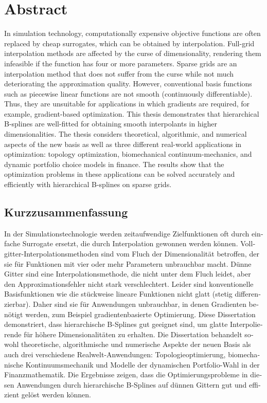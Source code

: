 
\printornamentsfalse
\section*{Abstract}
\printornamentstrue

In simulation technology, computationally expensive objective
functions are often replaced
by cheap surrogates, which can be obtained by interpolation.
Full-grid interpolation methods are affected by the curse of dimensionality,
rendering them infeasible if the function has four or more parameters.
Sparse grids are an interpolation method that does not suffer from the
curse while not much deteriorating the approximation quality.
However, conventional basis functions such as piecewise linear functions
are not smooth (continuously differentiable).
Thus, they are unsuitable for applications in which gradients are required,
for example, gradient-based optimization.
This thesis demonstrates that hierarchical B-splines are well-fitted for
obtaining smooth interpolants in higher dimensionalities.
The thesis considers theoretical, algorithmic, and numerical aspects of the
new basis as well as three different real-world applications in optimization:
topology optimization, biomechanical continuum-mechanics, and
dynamic portfolio choice models in finance.
The results show that the optimization problems in these applications
can be solved accurately and efficiently with hierarchical B-splines on
sparse grids.

\begin{otherlanguage}{ngerman}
  \section*{Kurzzusammenfassung}
  
  In der Simulationstechnologie werden zeitaufwendige Zielfunktionen
  oft durch einfache Surrogate ersetzt, die durch Interpolation
  gewonnen werden können.
  Vollgitter-Interpolationsmethoden sind vom Fluch der
  Dimensionalität betroffen, der sie für Funktionen mit vier oder mehr
  Parametern unbrauchbar macht.
  Dünne Gitter sind eine Interpolationsmethode, die nicht unter
  dem Fluch leidet, aber den Approximationsfehler nicht stark verschlechtert.
  Leider sind konventionelle Basisfunktionen wie die stückweise
  lineare Funktionen nicht glatt (stetig differenzierbar).
  Daher sind sie für Anwendungen unbrauchbar, in denen Gradienten
  benötigt werden, zum Beispiel gradientenbasierte Optimierung.
  Diese Dissertation demonstriert, dass hierarchische B-Splines gut
  geeignet sind, um glatte Interpolierende für höhere
  Dimensionalitäten zu erhalten.
  Die Dissertation behandelt sowohl theoretische, algorithmische und numerische
  Aspekte der neuen Basis als auch drei verschiedene
  Realwelt-Anwendungen:
  Topologieoptimierung, biomechanische Kontinuumsmechanik und
  Modelle der dynamischen Portfolio-Wahl in der Finanzmathematik.
  Die Ergebnisse zeigen, dass die Optimierungsprobleme in diesen
  Anwendungen durch hierarchische B-Splines auf dünnen Gittern
  gut und effizient gelöst werden können.
\end{otherlanguage}
